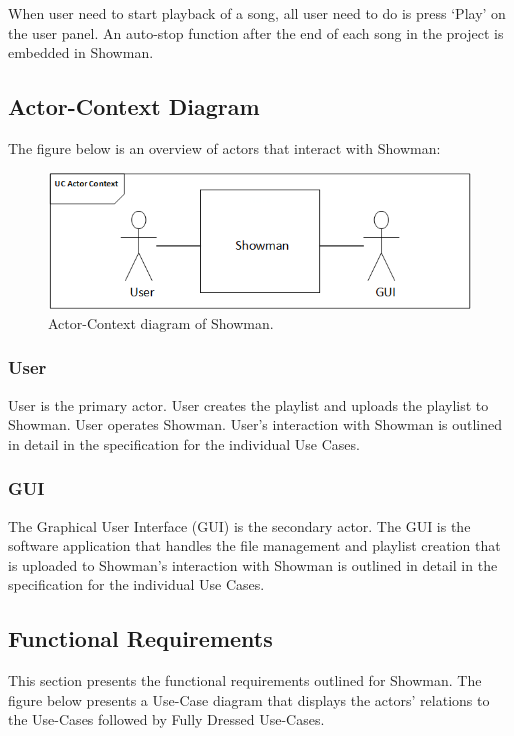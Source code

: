 When user need to start playback of a song, all user need to do is press `Play' on the user panel. An auto-stop function after the end of each song in the project is embedded in Showman. \newline

\subsection{Actor-Context Diagram}

The figure below is an overview of actors that interact with Showman:

\begin{figure}[htb!]
\centering
\includegraphics[scale=1]{./pictures/ActorContext.png}
\caption{Actor-Context diagram of Showman.}
\label{fig:ActorContext.png}
\end{figure}

\subsubsection{User}
User is the primary actor. User creates the playlist and uploads the playlist to Showman. User operates Showman. User's interaction with Showman is outlined in detail in the specification for the individual Use Cases. \newline

\subsubsection{GUI}
The Graphical User Interface (GUI) is the secondary actor. The GUI is the software application that handles the file management and playlist creation that is uploaded to Showman's interaction with Showman is outlined in detail in the specification for the individual Use Cases. \newline

\subsection{Functional Requirements}
This section presents the functional requirements outlined for Showman. The figure below presents a Use-Case diagram that displays the actors' relations to the Use-Cases followed by Fully Dressed Use-Cases.

